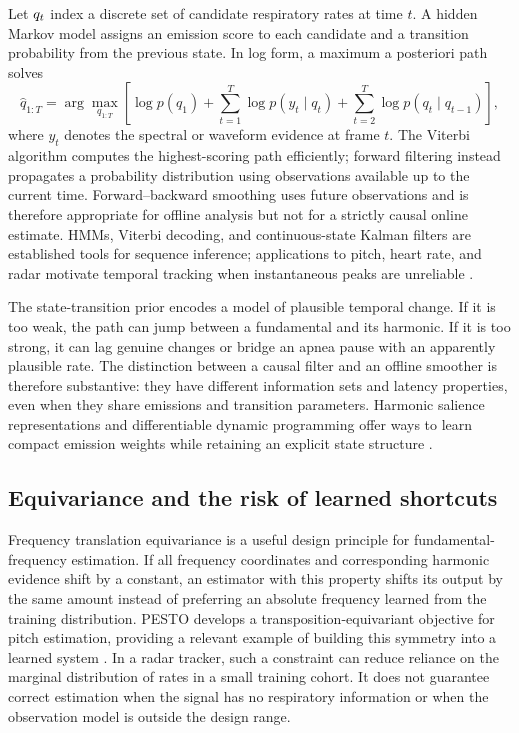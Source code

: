 Let $q_t$ index a discrete set of candidate respiratory rates at time $t$. A hidden
Markov model assigns an emission score to each candidate and a transition probability from the
previous state. In log form, a maximum a posteriori path solves
\begin{equation}
  \hat q_{1:T}=\arg\max_{q_{1:T}}
  \left[\log p(q_1)+\sum_{t=1}^{T}\log p(y_t\mid q_t)
  +\sum_{t=2}^{T}\log p(q_t\mid q_{t-1})\right],
  \label{eq:ch2_hmm}
\end{equation}
where $y_t$ denotes the spectral or waveform evidence at frame $t$. The Viterbi algorithm computes
the highest-scoring path efficiently; forward filtering instead propagates a probability
distribution using observations available up to the current time. Forward--backward smoothing uses
future observations and is therefore appropriate for offline analysis but not for a strictly
causal online estimate. HMMs, Viterbi decoding, and continuous-state Kalman filters are established
tools for sequence inference; applications to pitch, heart rate, and radar motivate temporal
tracking when instantaneous peaks are unreliable
\citep{rabiner1989tutorial,mauch2014pyin,temko2017accurate,xie2019unobtrusive,ye2021spectral,arsalan2020improved}.

The state-transition prior encodes a model of plausible temporal change. If it is too weak, the
path can jump between a fundamental and its harmonic. If it is too strong, it can lag genuine
changes or bridge an apnea pause with an apparently plausible rate. The distinction between a
causal filter and an offline smoother is therefore substantive: they have different information
sets and latency properties, even when they share emissions and transition parameters. Harmonic
salience representations and differentiable dynamic programming offer ways to learn compact
emission weights while retaining an explicit state structure
\citep{bittner2017deep,mensch2018differentiable}.

\subsection{Equivariance and the risk of learned shortcuts}

Frequency translation equivariance is a useful design principle for fundamental-frequency
estimation. If all frequency coordinates and corresponding harmonic evidence shift by a constant,
an estimator with this property shifts its output by the same amount instead of preferring an
absolute frequency learned from the training distribution. PESTO develops a transposition-equivariant
objective for pitch estimation, providing a relevant example of building this symmetry into a
learned system \citep{riou2023pesto}. In a radar tracker, such a constraint can reduce reliance on
the marginal distribution of rates in a small training cohort. It does not guarantee correct
estimation when the signal has no respiratory information or when the observation model is outside
the design range.


